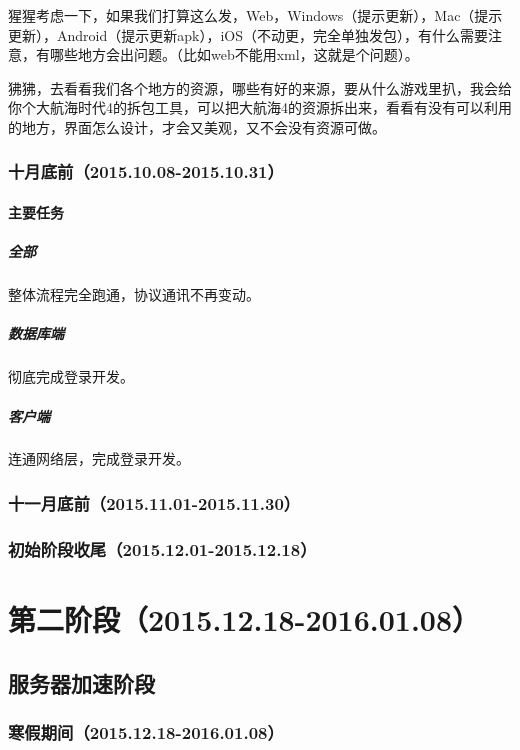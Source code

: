 \documentclass[UTF8]{ctexart}
\begin{document}
猩猩考虑一下，如果我们打算这么发，Web，Windows（提示更新），Mac（提示更新），Android（提示更新apk），iOS（不动更，完全单独发包），有什么需要注意，有哪些地方会出问题。（比如web不能用xml，这就是个问题）。

狒狒，去看看我们各个地方的资源，哪些有好的来源，要从什么游戏里扒，我会给你个大航海时代4的拆包工具，可以把大航海4的资源拆出来，看看有没有可以利用的地方，界面怎么设计，才会又美观，又不会没有资源可做。

\subsubsection{十月底前（2015.10.08-2015.10.31）}
\paragraph{主要任务}
\subparagraph{全部}
整体流程完全跑通，协议通讯不再变动。
\subparagraph{数据库端}
彻底完成登录开发。
\subparagraph{客户端}
连通网络层，完成登录开发。

\subsubsection{十一月底前（2015.11.01-2015.11.30）}

\subsubsection{初始阶段收尾（2015.12.01-2015.12.18）}

\paragraph{}

\subparagraph{}

\section{第二阶段（2015.12.18-2016.01.08）}
\subsection{服务器加速阶段}

\subsubsection{寒假期间（2015.12.18-2016.01.08）}


\paragraph{}

\subparagraph{}
\end{document}

